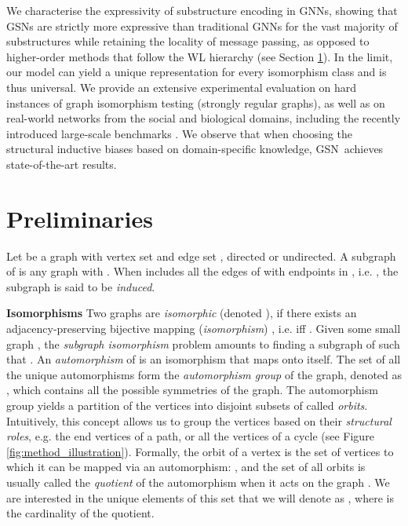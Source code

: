 \documentclass{article} \usepackage{iclr2021_conference,times}
\newcommand{\modelname}{GSN}
\begin{document}
We characterise the expressivity of substructure encoding in GNNs, showing that GSNs are strictly more expressive than traditional GNNs for the vast majority of substructures while retaining the locality of message passing, as opposed to higher-order methods \citep{DBLP:conf/iclr/MaronBSL19,pmlr-v97-maron19a, maron2019provably, morris2019weisfeiler} that follow the WL hierarchy (see Section \ref{sec:prelims}). 
In the limit, our model can yield a unique representation for every isomorphism class and is thus universal. 
We provide an extensive experimental evaluation on hard instances of graph isomorphism testing (strongly regular graphs), as well as on real-world networks from the social and biological domains, including the recently introduced large-scale benchmarks \citep{dwivedi2020benchmarking, DBLP:ogb}. We observe that when choosing the structural inductive biases based on domain-specific knowledge, \modelname\ achieves state-of-the-art results.



\section{Preliminaries}\label{sec:prelims}

Let  be a graph with vertex set  and edge set , directed or undirected. A subgraph  of  is any graph with . When  includes all the edges of  with endpoints in , i.e.  ,
the subgraph is said to be \textit{induced}. 

\noindent\textbf{Isomorphisms}
Two graphs  are {\em isomorphic} (denoted ), if there exists an adjacency-preserving bijective mapping ({\em isomorphism}) , i.e.  iff . Given some small graph , the \textit{subgraph isomorphism} problem amounts to finding a subgraph  of  such that . An \textit{automorphism} of  is an isomorphism that maps  onto itself. The set of all the unique automorphisms form the \textit{automorphism group} of the graph, denoted as , which contains all the possible symmetries of the graph. The automorphism group yields a partition of the vertices into disjoint subsets of  called \textit{orbits}. Intuitively, this concept allows us to group the vertices based on their \textit{structural roles}, e.g. the end vertices of a path, or all the vertices of a cycle (see Figure \ref{fig:method_illustration}). Formally, the 
orbit of a vertex  is the set of vertices to which it can be mapped via an automorphism: , and the set of all orbits  is usually called the \textit{quotient} of the automorphism when it acts on the graph . We are interested in the unique elements of this set that we will denote as , where  is the cardinality of the quotient.
\end{document}
